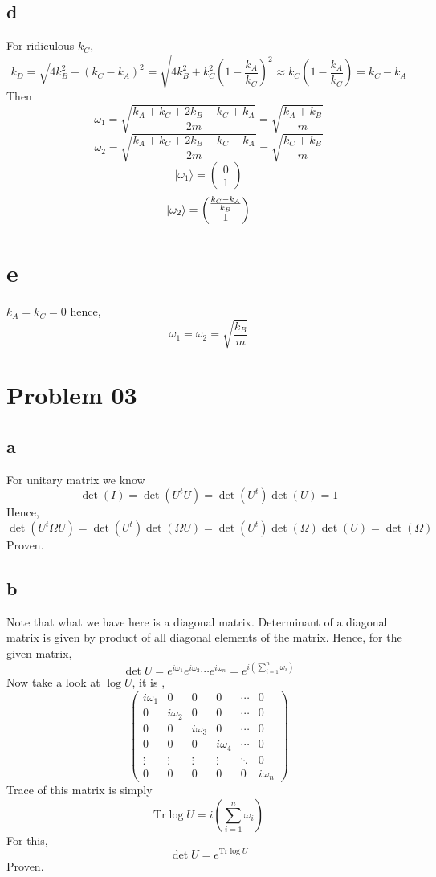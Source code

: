\documentclass[letter]{article}
\begin{document}
\subsection*{d} 
For ridiculous $k_C$, 
\[
k_D = \sqrt{4k_B^2 + (k_C - k_A)^2} = \sqrt{4k_B^2 + k_C^2 \left(1 - \frac{k_A}{k_C}\right)^2}   \approx
k_C \left(1 - \frac{k_A}{k_C}\right) = k_C - k_A
\]
Then 
\[
\omega_1 = \sqrt{ \frac{k_A + k_C + 2 k_B - k_C + k_A}{2m}}   = \sqrt{\frac{k_A + k_B}{m}} 
\] 
\[
\omega_2 = \sqrt{\frac{k_A + k_C + 2k_B + k_C - k_A}{2m}}  = \sqrt{\frac{k_C + k_B}{m}}  
\]
\[
| \omega_1 \rangle = \begin{pmatrix} 0\\1 \end{pmatrix} 
\] 
\[
| \omega_2 \rangle =  \begin{pmatrix}   {k_C - k_A \over  k_B} \\ 1 \end{pmatrix} 
\] 


\section*{e} 
$k_A = k_C = 0$ hence, 
\[
\omega_1 = \omega_2 = \sqrt{\frac{k_B}{m}} 
\] 



\section*{Problem 03}
\subsection*{a} 
For unitary matrix we know 
\[
\det(I) = 	\det (U^{t} U ) = \det(U^{t}) \det(U)  = 1
\]
Hence, 
\[
\det(U^{t} \Omega U) = \det(U^{t}) \det(\Omega U) = 
\det (U^{t} ) \det(\Omega) \det (U) = \det(\Omega)
\] 
Proven.


\subsection*{b} 
Note that what we have here is a diagonal matrix. Determinant of a diagonal matrix is given by
product of all diagonal elements of the matrix. Hence, for the given matrix,
\[
\det U = e^{ i \omega_1} e^{i \omega_2} \cdots e^{i \omega_n} = e^{i (\sum_{i=1}^{n} \omega_i)}
\]
Now take a look at $\log U$, it is ,
\[
	\begin{pmatrix} i \omega_1 & 0 & 0 & 0 & \cdots &0 \\
	0 & i \omega_2 & 0 & 0 & \cdots & 0 \\ 
	0 & 0 & i \omega_3 & 0 &\cdots &0 \\ 
0 & 0 & 0 & i \omega_4 & \cdots & 0 \\ 
\vdots & \vdots & \vdots& \vdots & \ddots & 0 \\
0 & 0 & 0 & 0 & 0 & i \omega_n\end{pmatrix} 
\] 
Trace of this matrix is simply
\[
\text{Tr} \log U = i \left(\sum_{i = 1}^{n} \omega_i\right)
\]
For this, 
\[
\det U = e^{\text{Tr} \log U}
\] 
Proven. 
\end{document}

